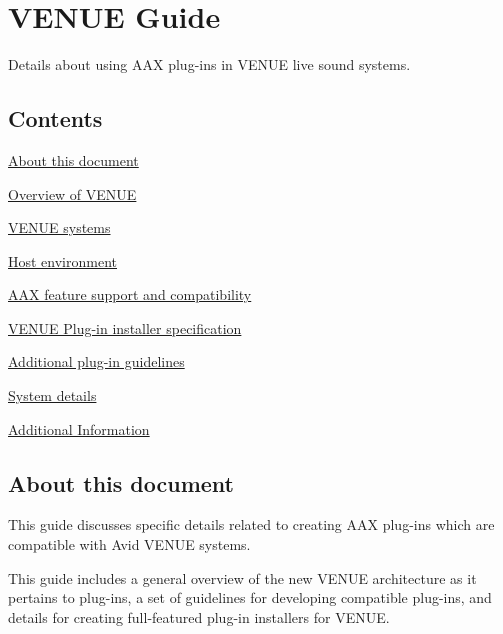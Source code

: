 \hypertarget{a00377}{}\section{V\+E\+N\+U\+E Guide}
\label{a00377}
Details about using A\+A\+X plug-\/ins in V\+E\+N\+U\+E live sound systems. 

\hypertarget{a00377_aax_venue_guide_contents}{}\subsection{Contents}\label{a00377_aax_venue_guide_contents}
\begin{DoxyItemize}
\item \hyperlink{a00377_aax_venue_guide__about_this_document}{About this document} \item \hyperlink{a00377_aax_venue_guide__overview}{Overview of V\+E\+N\+U\+E} \item \hyperlink{a00377_aax_venue_guide__systems}{V\+E\+N\+U\+E systems} \item \hyperlink{a00377_aax_venue_guide__environment}{Host environment} \item \hyperlink{a00377_aax_venue_guide__features}{A\+A\+X feature support and compatibility} \item \hyperlink{a00377_aax_venue_guide__installer}{V\+E\+N\+U\+E Plug-\/in installer specification} \item \hyperlink{a00377_aax_venue_guide__guidelines}{Additional plug-\/in guidelines} \item \hyperlink{a00377_aax_venue_guide__system_details}{System details} \item \hyperlink{a00377_aax_venue_guide__additional_information}{Additional Information}\end{DoxyItemize}
 \hypertarget{a00377_aax_venue_guide__about_this_document}{}\subsection{About this document}\label{a00377_aax_venue_guide__about_this_document}
This guide discusses specific details related to creating A\+A\+X plug-\/ins which are compatible with Avid V\+E\+N\+U\+E systems.

This guide includes a general overview of the new V\+E\+N\+U\+E architecture as it pertains to plug-\/ins, a set of guidelines for developing compatible plug-\/ins, and details for creating full-\/featured plug-\/in installers for V\+E\+N\+U\+E.

